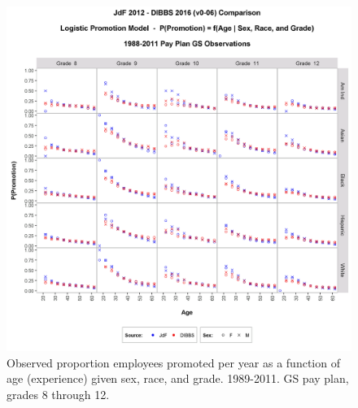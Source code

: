 \documentclass[10pt, letterpaper]{article}
\begin{document}
\begin{spacing}{1.0}
\clearpage

\begin{figure}[]
    \centering
    \includegraphics[width=6in, trim={0 0 0 1in}, clip]{PromotionSexRaceageGS8-12Observed.png}
    \caption{Observed proportion employees promoted per year as a function of age (experience) given sex, race, and grade.  1989-2011.  GS pay plan, grades 8 through 12.}
    \label{figure:PromotionSexRaceageGS8-12Observed}
\end{figure}

\clearpage


\end{spacing}
\end{document}
